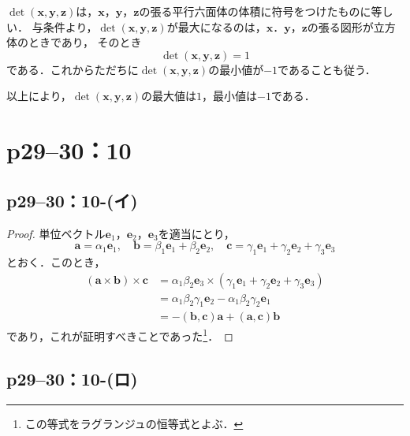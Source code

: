 \documentclass[a4paper,10pt,fleqn]{ltjsarticle}
\begin{document}
\begin{tleftbar}
  $ \det (\bm{x},\bm{y},\bm{z})$は，$\bm{x}$，$\bm{y}$，$\bm{z}$の張る平行六面体の体積に符号をつけたものに等しい．
  与条件より，$\det (\bm{x},\bm{y},\bm{z})$が最大になるのは，$\bm{x}$．$\bm{y}$，$\bm{z}$の張る図形が立方体のときであり，
  そのとき
  \[
    \det (\bm{x},\bm{y},\bm{z}) =1
  \]
  である．これからただちに$\det (\bm{x},\bm{y},\bm{z})$の最小値が$-1$であることも従う．

  以上により，$\det (\bm{x},\bm{y},\bm{z})$の最大値は$1$，最小値は$-1$である．
\end{tleftbar}

\section*{p29--30：10}

\subsection*{p29--30：10-(イ)}

\begin{tleftbar}
  \begin{proof}
    単位ベクトル$\bm{e}_1$，$\bm{e}_2$，$\bm{e}_3$を適当にとり，
    \[
      \bm{a} = \alpha_1 \bm{e}_1,\quad \bm{b} = \beta_1 \bm{e}_1+\beta_2 \bm{e}_2,\quad \bm{c}= \gamma_1 \bm{e}_1 + \gamma_2 \bm{e}_2 + \gamma_3 \bm{e}_3
    \]
    とおく．このとき，
    \begin{align*}
      (\bm{a} \times \bm{b}) \times \bm{c} & = \alpha_1 \beta_2 \bm{e}_3 \times (\gamma_1 \bm{e}_1 + \gamma_2 \bm{e}_2 + \gamma_3 \bm{e}_3) \\
                                           & = \alpha_1 \beta_2 \gamma_1 \bm{e}_2 - \alpha_1 \beta_2 \gamma_2 \bm{e}_1                      \\
                                           & = -(\bm{b},\bm{c})\bm{a}+(\bm{a},\bm{c}) \bm{b}
    \end{align*}
    であり，これが証明すべきことであった\footnote{この等式をラグランジュの恒等式とよぶ．}．
  \end{proof}
\end{tleftbar}

\subsection*{p29--30：10-(ロ)}
\end{document}
